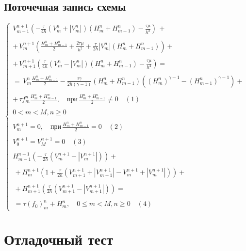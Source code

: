 \documentclass[12pt]{article}
\begin{document}
\subsection{Поточечная запись схемы}
$
  \left \{
    \begin{array}{l}
      V_{m-1}^{n+1} (-\frac{\tau}{4h} (V_{m}^{n} + |V_{m}^{n}|) (H_{m}^{n} + H_{m - 1} ^{n}) - \frac {\tau \mu} {h^{2}}) \, + \\ \\ 
      + \,V_{m}^{n + 1} (\frac{H_{m}^{n} + H_{m - 1} ^ {n}}{2} + \frac{2 \tau \mu} {h^{2}} + \frac{\tau}{2h} |V_{m}^{n}|(H_{m}^{n} + H_{m -  1} ^ {n})) +\\ \\
      + \,V_{m+1}^{n+1} (\frac {\tau}{4h} (V_{m}^{n} - |V_{m}^{n}|) (H_{m}^{n} + H_{m-1}^{n}) - \frac{\tau \mu} {h^{2}})  = \\   \\
      =\, V_{m}^{n} \frac{H_{m}^{n} + H_{m - 1}^{n}} {2} - \frac {\tau \gamma}{2h (\gamma - 1)} (H_{m}^{n} + H_{m - 1}^{n}) ((H_{m}^{n})^{\gamma - 1} - 
      (H_{m - 1}^{n})^{\gamma - 1}) +  \\ \\ 
      + \,\tau f_{m}^{n} \frac{H_{m}^{n} + H_{m-1}^{n}}{2}, \quad \text{при} \, \frac{H_{m}^{n} + H_{m - 1}^{n}}{2} \neq 0 \quad (1) \\ \\
      0<m<M, n \geq 0 \\ \\
      V_{m}^{n+1} = 0, \quad \text{при} \, \frac{H_{m}^{n} + H_{m - 1}^{n}}{2} = 0 \quad (2)\\ \\
      V_{0}^{n+1} = V_{M}^{n+1} = 0 \quad(3) \\ \\ 
      H_{m-1}^{n+1} (-\frac{\tau}{2h} (V_{m}^{n+1} + |V_{m}^{n+1}|))  + \\ \\
      \, + H_{m}^{n+1} (1 + \frac{\tau} {2h} (V_{m+1}^{n+1} + |V_{m+1}^{n+1}| - V_{m}^{n+1} + |V_{m}^{n+1}|)) +\\ \\
      \, + H_{m+1}^{n+1} (\frac{\tau}{2h} (V_{m+1}^{n+1} - |V_{m+1}^{n+1}|)) =\\ \\
      \, = \tau (f_{0})^{n}_{m} + H_{m}^{n},  \quad 0 \leq m<M, n \geq 0 \quad (4)
    \end{array}  
  \right .
$

\section{Отладочный тест}
\end{document}
